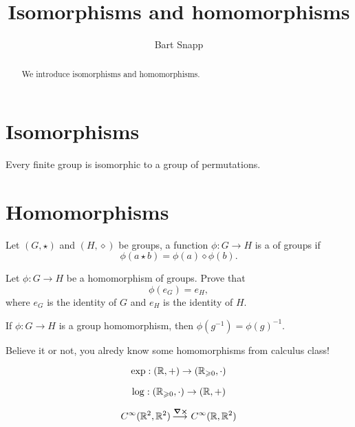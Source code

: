 \documentclass{ximera}
\author{Bart Snapp}
\title{Isomorphisms and homomorphisms}
\begin{document}
\begin{abstract}
  We introduce isomorphisms and homomorphisms.
\end{abstract}
\maketitle



\section{Isomorphisms}


\begin{theorem}[Cayley]
  Every finite group is isomorphic to a group of permutations.
\end{theorem}



\section{Homomorphisms}

\begin{definition}
  Let $(G,\star)$ and $(H,\diamond)$ be groups, a function $\phi:G\to
  H$ is a  of groups if
  \[
  \phi(a\star b) = \phi(a)\diamond\phi(b).
  \]
\end{definition}

\begin{exercise}\label{L:HPId}
  Let $\phi:G\to H$ be a homomorphism of groups. Prove that
  \[
  \phi(e_G) = e_H,
  \]
  where $e_G$ is the identity of $G$ and $e_H$ is the identity of
  $H$.
\end{exercise}



\begin{lemma}\label{L:HPI}
  If $\phi:G\to H$ is a group homomorphism, then $\phi(g^{-1}) =
  \phi(g)^{-1}$.
\end{lemma}




Believe it or not, you alredy know some homomorphisms from calculus
class!

\[
\exp:(\mathbb R,+) \to (\mathbb R_{\geqslant 0},\cdot)
\]

\[
\log:(\mathbb R_{\geqslant 0},\cdot) \to (\mathbb R,+)
\]

\[
C^\infty(\mathbb R^2,\mathbb R^2) \mathop{\longrightarrow\,}\limits^{\boldsymbol{\nabla\times}} C^\infty(\mathbb R,\mathbb R^2)
\]
\end{document}
